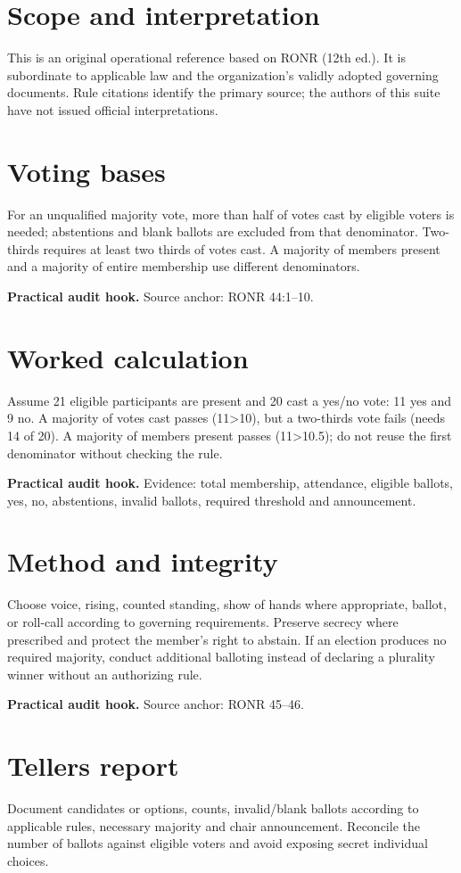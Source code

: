 \documentclass[11pt]{article}
\begin{document}
\SuiteOpen
\section{Scope and interpretation}
This is an original operational reference based on RONR (12th ed.). It is subordinate to applicable law and the organization’s validly adopted governing documents. Rule citations identify the primary source; the authors of this suite have not issued official interpretations.

\section{Voting bases}
For an unqualified majority vote, more than half of votes cast by eligible voters is needed; abstentions and blank ballots are excluded from that denominator. Two-thirds requires at least two thirds of votes cast. A majority of members present and a majority of entire membership use different denominators.

\textbf{Practical audit hook.} Source anchor: RONR 44:1--10.

\section{Worked calculation}
Assume 21 eligible participants are present and 20 cast a yes/no vote: 11 yes and 9 no. A majority of votes cast passes (11>10), but a two-thirds vote fails (needs 14 of 20). A majority of members present passes (11>10.5); do not reuse the first denominator without checking the rule.

\textbf{Practical audit hook.} Evidence: total membership, attendance, eligible ballots, yes, no, abstentions, invalid ballots, required threshold and announcement.

\section{Method and integrity}
Choose voice, rising, counted standing, show of hands where appropriate, ballot, or roll-call according to governing requirements. Preserve secrecy where prescribed and protect the member’s right to abstain. If an election produces no required majority, conduct additional balloting instead of declaring a plurality winner without an authorizing rule.

\textbf{Practical audit hook.} Source anchor: RONR 45--46.

\section{Tellers report}
Document candidates or options, counts, invalid/blank ballots according to applicable rules, necessary majority and chair announcement. Reconcile the number of ballots against eligible voters and avoid exposing secret individual choices.
\end{document}

